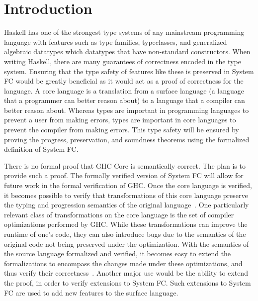 \documentclass{sig-alternate}
\begin{document}
\section{Introduction}
\label{sec:intro}
Haskell has one of the strongest type systems of any mainstream programming language with features such as type families, typeclasses, and generalized algebraic datatypes which datatypes that have non-standard constructors. When writing Haskell, there are many guarantees of correctness encoded in the type system. Ensuring that the type safety of features like these is preserved in System FC would be greatly beneficial as it would act as a proof of correctness for the language. A core language is a translation from a surface language (a language that a programmer can better reason about) to a language that a compiler can better reason about. Whereas types are important in programming languages to prevent a user from making errors, types are important in core languages to prevent the compiler from making errors. This type safety will be ensured by proving the progress, preservation, and soundness theorems using the formalized definition of System FC.



There is no formal proof that GHC Core is semantically correct. The plan is to provide such a proof. The formally verified version of System FC will allow for future work in the formal verification of GHC. Once the core language is verified, it becomes possible to verify that transformations of this core language preserve the typing and progression semantics of the original language~\cite{zhao2013formalizing}. One particularly relevant class of transformations on the core language is the set of compiler optimizations performed by GHC. While these transformations can improve the runtime of one's code, they can also introduce bugs due to the semantics of the original code not being preserved under the optimization. With the semantics of the source language formalized and verified, it becomes easy to extend the formalizations to encompass the changes made under these optimizations, and thus verify their correctness~\cite{Zhao:2012:FLI:2103656.2103709}. Another major use would be the ability to extend the proof, in order to verify extensions to System FC. Such extensions to System FC are used to add new features to the surface language.
\end{document}
